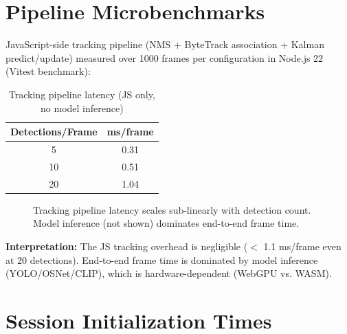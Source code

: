 \section{Pipeline Microbenchmarks}
\label{sec:microbench}

JavaScript-side tracking pipeline (NMS + ByteTrack association + Kalman predict/update) measured over 1000 frames per configuration in Node.js 22 (Vitest benchmark):

\begin{table}[htbp]
\centering
\caption{Tracking pipeline latency (JS only, no model inference)}
\label{tab:pipeline-perf}
\begin{tabular}{@{}cc@{}}
\toprule
\textbf{Detections/Frame} & \textbf{ms/frame} \\
\midrule
5  & 0.31 \\
10 & 0.51 \\
20 & 1.04 \\
\bottomrule
\end{tabular}
\end{table}

\begin{figure}[htbp]
\centering
{}
\caption{Tracking pipeline latency scales sub-linearly with detection count. Model inference (not shown) dominates end-to-end frame time.}
\label{fig:perf-chart}
\end{figure}

\vspace{0.3cm}

\noindent \textbf{Interpretation:} The JS tracking overhead is negligible ($<$ 1.1 ms/frame even at 20 detections). End-to-end frame time is dominated by model inference (YOLO/OSNet/CLIP), which is hardware-dependent (WebGPU vs. WASM).

\section{Session Initialization Times}
\label{sec:init-times}

